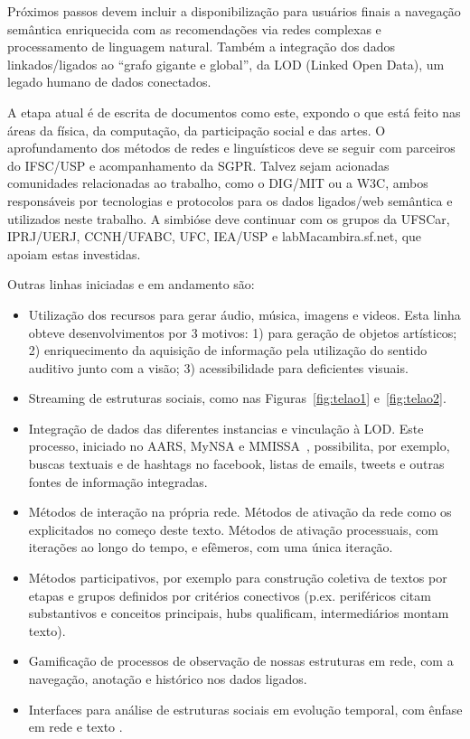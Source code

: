\documentclass[a4paper, 11pt]{article} %
\begin{document}
Próximos passos devem incluir a disponibilização para usuários finais a navegação semântica enriquecida com as recomendações via redes complexas e processamento de linguagem natural. Também a integração dos dados linkados/ligados ao ``grafo gigante e global'', da LOD (Linked Open Data), um legado humano de dados conectados.

A etapa atual é de escrita de documentos como este, expondo o que está feito nas áreas da física, da computação, da participação social e das artes. O aprofundamento dos métodos de redes e linguísticos deve se seguir com parceiros do IFSC/USP e acompanhamento da SGPR. Talvez sejam acionadas comunidades relacionadas ao trabalho, como o DIG/MIT ou a W3C, ambos responsáveis por tecnologias e protocolos para os dados ligados/web semântica e utilizados neste trabalho. A simbióse deve continuar com os grupos da UFSCar, IPRJ/UERJ, CCNH/UFABC, UFC, IEA/USP e labMacambira.sf.net, que apoiam estas investidas.

Outras linhas iniciadas e em andamento são:
\begin{itemize}
\item Utilização dos recursos para gerar áudio, música, imagens e videos. Esta linha obteve desenvolvimentos por 3 motivos: 1) para geração de objetos artísticos; 2) enriquecimento da aquisição de informação pela utilização do sentido auditivo junto com a visão; 3) acessibilidade para deficientes visuais.
\item Streaming de estruturas sociais, como nas Figuras~\ref{fig:telao1} e~\ref{fig:telao2}.
\item Integração de dados das diferentes instancias e vinculação à LOD. Este processo, iniciado no AARS, MyNSA e MMISSA~\cite{mynsa,mmissa}, possibilita, por exemplo, buscas textuais e de hashtags no facebook, listas de emails, tweets e outras fontes de informação integradas.
\item Métodos de interação na própria rede. Métodos de ativação da rede como os explicitados no começo deste texto. Métodos de ativação processuais, com iterações ao longo do tempo, e efêmeros, com uma única iteração.
\item Métodos participativos, por exemplo para construção coletiva de textos por etapas e grupos definidos por critérios conectivos (p.ex. periféricos citam substantivos e conceitos principais, hubs qualificam, intermediários montam texto).
\item Gamificação de processos de observação de nossas estruturas em rede, com a navegação, anotação e histórico nos dados ligados.
\item Interfaces para análise de estruturas sociais em evolução temporal, com ênfase em rede e texto .
\end{itemize}
\end{document}
